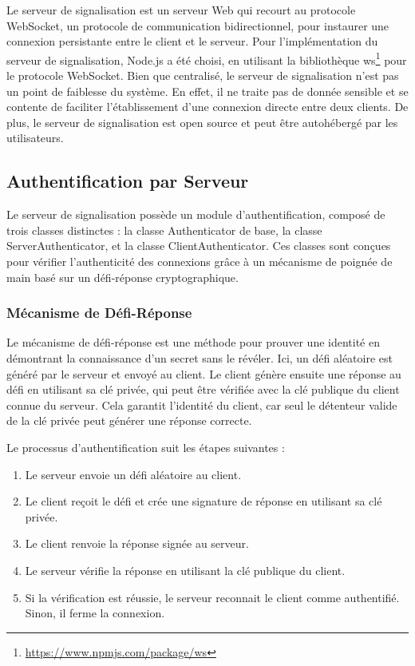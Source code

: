 Le serveur de signalisation est un serveur Web qui recourt au protocole \Gls{WebSocket}, un protocole de communication bidirectionnel, pour instaurer une connexion persistante entre le client et le serveur. Pour l'implémentation du serveur de signalisation, Node.js a été choisi, en utilisant la bibliothèque ws\footnote{\url{https://www.npmjs.com/package/ws}} pour le protocole \Gls{WebSocket}. Bien que centralisé, le serveur de signalisation n'est pas un point de faiblesse du système. En effet, il ne traite pas de donnée sensible et se contente de faciliter l'établissement d'une connexion directe entre deux clients. De plus, le serveur de signalisation est open source et peut être autohébergé par les utilisateurs.

\subsection{Authentification par Serveur}

Le serveur de signalisation possède un module d'authentification, composé de trois classes distinctes : la classe Authenticator de base, la classe ServerAuthenticator, et la classe ClientAuthenticator. Ces classes sont conçues pour vérifier l'authenticité des connexions grâce à un mécanisme de poignée de main basé sur un défi-réponse cryptographique.

\subsubsection{Mécanisme de Défi-Réponse}

Le mécanisme de défi-réponse est une méthode pour prouver une identité en démontrant la connaissance d'un secret sans le révéler. Ici, un défi aléatoire est généré par le serveur et envoyé au client. Le client génère ensuite une réponse au défi en utilisant sa clé privée, qui peut être vérifiée avec la clé publique du client connue du serveur. Cela garantit l'identité du client, car seul le détenteur valide de la clé privée peut générer une réponse correcte.

Le processus d'authentification suit les étapes suivantes :

\begin{enumerate}
    \item Le serveur envoie un défi aléatoire au client.
    \item Le client reçoit le défi et crée une signature de réponse en utilisant sa clé privée.
    \item Le client renvoie la réponse signée au serveur.
    \item Le serveur vérifie la réponse en utilisant la clé publique du client.
    \item Si la vérification est réussie, le serveur reconnait le client comme authentifié. Sinon, il ferme la connexion.
\end{enumerate}

